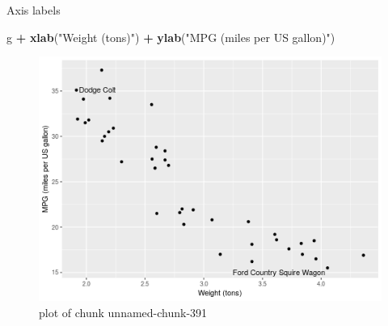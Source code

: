 \documentclass[ignorenonframetext,]{beamer}
\newenvironment{Shaded}{\begin{snugshade}}{\end{snugshade}}
\newcommand{\KeywordTok}[1]{\textcolor[rgb]{0.13,0.29,0.53}{\textbf{#1}}}
\newcommand{\NormalTok}[1]{#1}
\newcommand{\OperatorTok}[1]{\textcolor[rgb]{0.81,0.36,0.00}{\textbf{#1}}}
\newcommand{\StringTok}[1]{\textcolor[rgb]{0.31,0.60,0.02}{#1}}
\begin{document}
\begin{frame}[fragile]{Axis labels}
\protect\hypertarget{axis-labels}{}

\begin{Shaded}
\begin{Highlighting}[]
\NormalTok{g }\OperatorTok{+}\StringTok{ }\KeywordTok{xlab}\NormalTok{(}\StringTok{"Weight (tons)"}\NormalTok{) }\OperatorTok{+}\StringTok{ }\KeywordTok{ylab}\NormalTok{(}\StringTok{"MPG (miles per US gallon)"}\NormalTok{)}
\end{Highlighting}
\end{Shaded}

\begin{figure}
\centering
\includegraphics{figure/unnamed-chunk-391-1.png}
\caption{plot of chunk unnamed-chunk-391}
\end{figure}

\end{frame}
\end{document}
